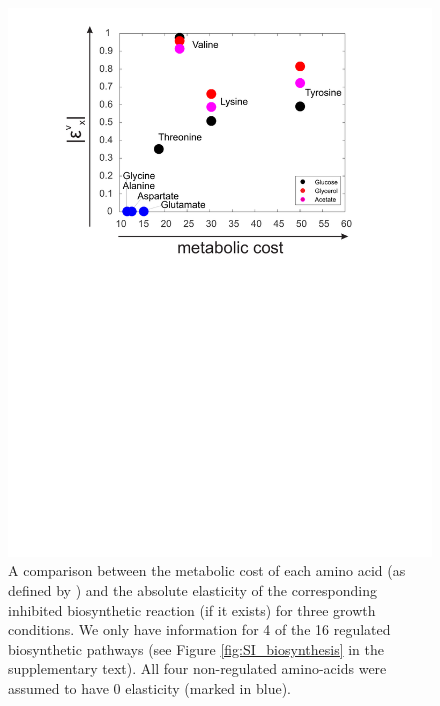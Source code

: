 \documentclass[12pt,a4paper]{article}
\begin{document}
\begin{figure}[ht!]
	\includegraphics[width=\textwidth]{../manuscript/figS9.pdf}
	\caption{A comparison between the metabolic cost of each amino acid (as defined by \cite{Akashi2002-ew}) and the absolute elasticity of the corresponding inhibited biosynthetic reaction (if it exists) for three growth conditions. We only have information for 4 of the 16 regulated biosynthetic pathways (see Figure \ref{fig:SI_biosynthesis} in the supplementary text). All four non-regulated amino-acids were assumed to have 0 elasticity (marked in blue).
	}
\end{figure}
\end{document}
